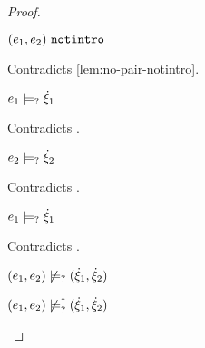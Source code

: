 \begin{proof}
\begin{byCases}
\begin{byCases}
\begin{byCases}
\begin{byCases}
                \begin{pfsteps*}
                \item $(e_1 , e_2) ~\mathtt{notintro}$ 
                \end{pfsteps*}
                Contradicts \autoref{lem:no-pair-notintro}.
            \item[\text{(\ref{rule:CMSPair1})}]
                \begin{pfsteps*}
                \item $e_1 \models_{?} \dot{\xi}_1$ 
                \end{pfsteps*}
                Contradicts .
            \item[\text{(\ref{rule:CMSPair2})}]
                \begin{pfsteps*}
                \item $e_2 \models_{?} \dot{\xi}_2$ 
                \end{pfsteps*}
                Contradicts .
            \item[\text{(\ref{rule:CMSPair3})}]
                \begin{pfsteps*}
                \item $e_1 \models_{?} \dot{\xi}_1$ 
                \end{pfsteps*}
                Contradicts .
            \end{byCases}
            \begin{pfsteps*}
            \item $(e_1 , e_2) \not\models_{?} (\dot{\xi}_1 , \dot{\xi}_2)$  
            \item $(e_1 , e_2) \not\models_{?}^{\dag} (\dot{\xi}_1 , \dot{\xi}_2)$ 
            \end{pfsteps*}
            

\end{byCases}
\end{byCases}
\end{byCases}
\end{proof}
